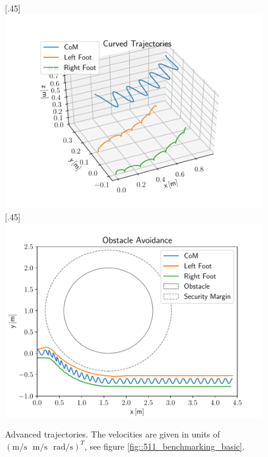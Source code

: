 \begin{figure}[h!]
	\centering
	[.45\linewidth]{\includegraphics[scale=.45]{chapters/05_experiments/01_user_controlled_walking/01_benchmarking/nmpc_turn.pdf}}
	[.45\linewidth]{\includegraphics[scale=.45]{chapters/05_experiments/01_user_controlled_walking/01_benchmarking/nmpc_obstacle.pdf}}
	\caption{Advanced trajectories. The velocities are given in units of\\$(\text{m}/\text{s}\,\,\,\,\text{m}/\text{s}\,\,\,\,\text{rad}/\text{s})^T$, see figure \ref{fig::511_benchmarking_basic}.}
	\label{fig::511_benchmarking_advanced}
\end{figure} 
